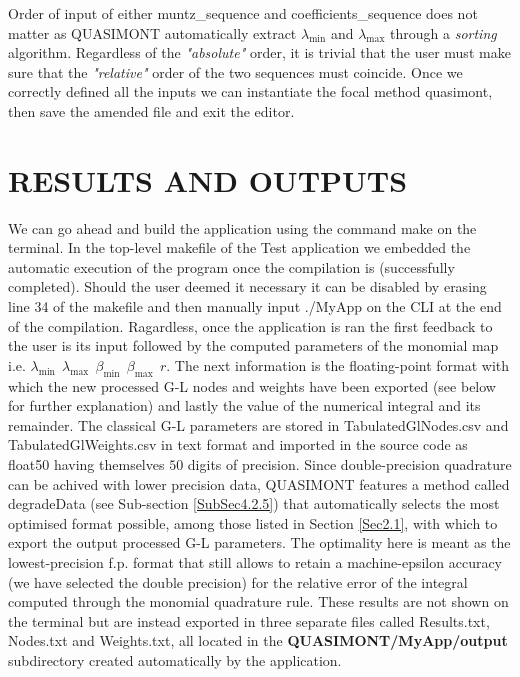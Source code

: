 \documentclass[a4paper, twosided]{book}
\begin{document}
Order of input of either \colorbox{poliGrayBlue}{muntz\_sequence} and \colorbox{poliGrayBlue}{coefficients\_sequence} does not matter as QUASIMONT automatically extract $\lambda_{\text{min}}$ and $\lambda_{\text{max}}$ through a \textsl{sorting} algorithm. Regardless of the \textsl{"absolute"} order, it is trivial that the user must make sure that the \textsl{"relative"} order of the two sequences must coincide. Once we correctly defined all the inputs we can instantiate the focal method \colorbox{poliGrayBlue}{quasimont}, then save the amended file and exit the editor.

\section[Results and outputs]{\changefont RESULTS AND OUTPUTS}\label{Sec3.2}

We can go ahead and build the application using the command \colorbox{poliGrayBlue}{make} on the terminal. In the top-level \colorbox{poliGrayBlue}{makefile} of the \colorbox{poliGrayBlue}{Test} application we embedded the automatic execution of the program once the compilation is (successfully completed). Should the user deemed it necessary it can be disabled by erasing line \colorbox{poliGrayBlue}{34} of the \colorbox{poliGrayBlue}{makefile} and then manually input \colorbox{poliGrayBlue}{./MyApp} on the CLI at the end of the compilation. Ragardless, once the application is ran the first feedback to the user is its input followed by the computed parameters of the monomial map i.e. $\lambda_{\text{min}}\,\;\lambda_{\text{max}}\,\;\beta_{\text{min}}\,\;\beta_{\text{max}}\,\;r$. The next information is the floating-point format with which the new processed G-L nodes and weights have been exported (see below for further explanation) and lastly the value of the numerical integral and its remainder. The classical G-L parameters are stored in \colorbox{poliGrayBlue}{TabulatedGlNodes.csv} and \colorbox{poliGrayBlue}{TabulatedGlWeights.csv} in text format and imported in the source code as \colorbox{poliGrayBlue}{float50} having themselves $50$ digits of precision. Since double-precision quadrature can be achived with lower precision data, QUASIMONT features a method called \colorbox{poliGrayBlue}{degradeData} (see Sub-section \ref{SubSec4.2.5}) that automatically selects the most optimised format possible, among those listed in Section \ref{Sec2.1}, with which to export the output processed G-L parameters. The optimality here is meant as the lowest-precision f.p. format that still allows to retain a machine-epsilon accuracy (we have selected the double precision) for the relative error of the integral computed through the monomial quadrature rule. These results are not shown on the terminal but are instead exported in three separate files called \colorbox{poliGrayBlue}{Results.txt}, \colorbox{poliGrayBlue}{Nodes.txt} and \colorbox{poliGrayBlue}{Weights.txt}, all located in the \colorbox{poliGrayBlue}{\textbf{QUASIMONT/MyApp/output}} subdirectory created automatically by the application. 
\end{document}
